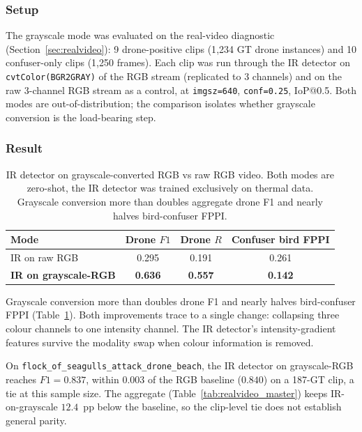 \subsubsection{Setup}

The grayscale mode was evaluated on the real-video diagnostic (Section~\ref{sec:realvideo}): 9 drone-positive clips (1{,}234 GT drone instances) and 10 confuser-only clips (1{,}250 frames). Each clip was run through the IR detector on \texttt{cvtColor(BGR2GRAY)} of the RGB stream (replicated to 3 channels) and on the raw 3-channel RGB stream as a control, at \texttt{imgsz=640}, \texttt{conf=0.25}, IoP@0.5. Both modes are out-of-distribution; the comparison isolates whether grayscale conversion is the load-bearing step.

\subsubsection{Result}

\begin{table}[htbp]
    \centering
    \caption{IR detector on grayscale-converted RGB vs raw RGB video. Both modes are zero-shot, the IR detector was trained exclusively on thermal data. Grayscale conversion more than doubles aggregate drone F1 and nearly halves bird-confuser FPPI.}
    \label{tab:ir_grayscale}
    \begin{tabular}{lccc}
        \toprule
        Mode & Drone $F1$ & Drone $R$ & Confuser bird FPPI \\
        \midrule
        IR on raw RGB             & 0.295 & 0.191 & 0.261 \\
        \textbf{IR on grayscale-RGB} & \textbf{0.636} & \textbf{0.557} & \textbf{0.142} \\
        \bottomrule
    \end{tabular}
\end{table}

Grayscale conversion more than doubles drone F1 and nearly halves bird-confuser FPPI (Table~\ref{tab:ir_grayscale}). Both improvements trace to a single change: collapsing three colour channels to one intensity channel. The IR detector's intensity-gradient features survive the modality swap when colour information is removed.

On \texttt{flock\_of\_seagulls\_attack\_drone\_beach}, the IR detector on grayscale-RGB reaches $F1=0.837$, within $0.003$ of the RGB baseline ($0.840$) on a 187-GT clip, a tie at this sample size. The aggregate (Table~\ref{tab:realvideo_master}) keeps IR-on-grayscale $12.4$~pp below the baseline, so the clip-level tie does not establish general parity.

